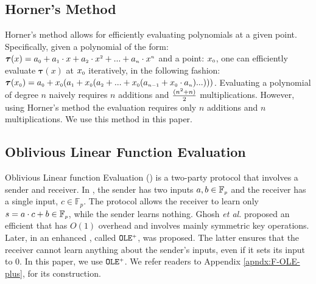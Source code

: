 \vs
\vs

\subsection{Horner's Method}
\svs

Horner's method \cite{DBLP:journals/ibmrd/Dorn62} allows for efficiently evaluating polynomials at a given point. Specifically, given a polynomial of the form: $\bm\tau(x)= a_{\scriptscriptstyle 0}+a_{\scriptscriptstyle 1}\cdot x+a_{\scriptscriptstyle 2}\cdot x^{\scriptscriptstyle 2}+...+a_{\scriptscriptstyle n}\cdot x^{\scriptscriptstyle n}$ and a point: $x_{\scriptscriptstyle 0}$, one can efficiently evaluate $\bm\tau(x)$ at $x_{\scriptscriptstyle 0}$ iteratively, in the following fashion: $\bm\tau(x_{\scriptscriptstyle 0})=a_{\scriptscriptstyle 0}+x_{\scriptscriptstyle 0}(a_{\scriptscriptstyle 1} + x_{\scriptscriptstyle 0}(a_{\scriptscriptstyle 2}+...+x_{\scriptscriptstyle 0}(a_{\scriptscriptstyle n-1}+x_{\scriptscriptstyle 0}\cdot a_{\scriptscriptstyle n})...)))$. Evaluating  a polynomial of degree $n$ naively requires  $n$ additions and $\frac{(n^{\scriptscriptstyle 2}+n)}{2}$ multiplications. However, using Horner's method the evaluation requires only $n$ additions and $n$ multiplications. We use this method in this paper. 

\vs
\vs

\subsection{Oblivious Linear Function Evaluation}\label{sec::OLE-plus}
\svs
Oblivious Linear function Evaluation (\ole) is a two-party protocol that involves a sender and receiver. In \ole,  the sender  has two  inputs  $a, b\in \mathbb{F}_{\scriptscriptstyle p}$ and the receiver has a single input, $c \in \mathbb{F}_{p}$.  The protocol allows the receiver to learn only $s = a\cdot c + b \in \mathbb{F}_{\scriptscriptstyle p}$, while the sender learns nothing. Ghosh \textit{et al.} \cite{GhoshNN17} proposed an efficient \ole that has $O(1)$ overhead and involves mainly symmetric key operations. Later, in \cite{GhoshN19} an enhanced \ole, called $\mathtt{OLE}^{\scriptscriptstyle +}$, was proposed. The latter ensures that the receiver cannot learn anything about the sender's inputs,  even if it sets its input to $0$. In this paper, we use $\mathtt{OLE}^{\scriptscriptstyle +}$. We refer readers to Appendix \ref{apndx:F-OLE-plus}, for its construction.  %


\vs
\vs
